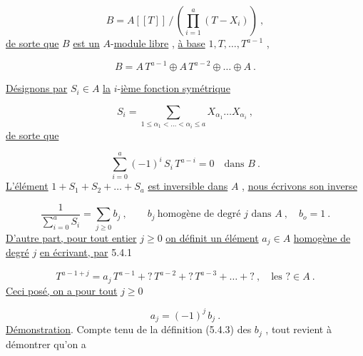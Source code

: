 \begin{equation*}
B = A[[T]] \, / \, \left( \prod_{i=1}^{a} (T-X_i) \right) \ ,
\end{equation*}
\underline{de sorte que} $B$ \underline{est un} $A$-\underline{module libre} , \underline{à base} $1,T,\ldots,T^{a-1}$ ,

\begin{equation}\tag{5.4.1}
B = A \, T^{a-1} \oplus A \, T^{a-2} \oplus \ldots \oplus A \ .
\end{equation}


\underline{Désignons par} $S_i \in A$ \underline{la} $i$-\underline{ième fonction symétrique}

\begin{equation*}
S_i = \sum_{1 \leq \alpha_1 < \ldots < \alpha_i \leq a} X_{\alpha_1} \ldots X_{\alpha_i} \ ,
\end{equation*}
\underline{de sorte que}

\begin{equation}\tag{5.4.2}
\sum_{i=0}^{a} (-1)^i \, S_i \, T^{a-i} = 0 \quad \mbox{dans } B \ .
\end{equation}
\underline{L'élément} $1 + S_1 + S_2 + \ldots + S_a$ \underline{est inversible dans} $A$ , \underline{nous écrivons son inverse}

\begin{equation}\tag{5.4.3}
\frac{1}{\sum\limits_{i=0}^{a} S_i} = \sum_{j \geq 0} b_j \ , \qquad b_j \ \mbox{homogène de degré } j \mbox{ dans } A \ , \quad b_o = 1 \ .
\end{equation}
\underline{D'autre part, pour tout entier} $j \geq 0$ \underline{on définit un élément} $a_j \in A$ \underline{homogène de degré} $j$ \underline{en écrivant, par} 5.4.1

\begin{equation}\tag{5.4.4}
T^{a-1+j} = a_j \, T^{a-1} + ? \, T^{a-2} + ? \, T^{a-3} + \ldots + ? \ , \quad \mbox{les } ? \in A \ .
\end{equation}
\underline{Ceci posé, on a pour tout} $j \geq 0$

\begin{equation}\tag{5.4.5}
a_j = (-1)^j \, b_j \ .
\end{equation}
\underline{Démonstration}. Compte tenu de la définition (5.4.3) des $b_j$ , tout revient à démontrer qu'on a 



